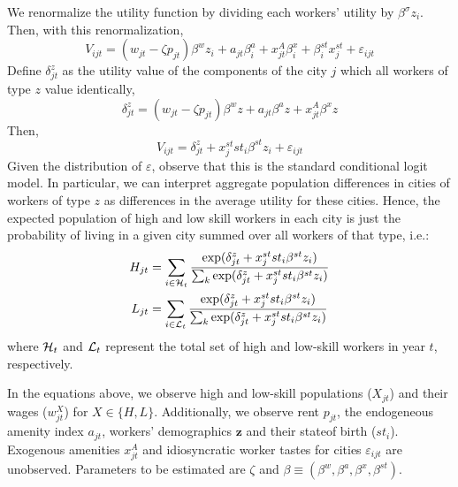 \documentclass{article}
\begin{document}
We renormalize the utility function by dividing each workers' utility by $\beta^\sigma z_i$. Then, with this renormalization,
$$V_{ijt} = (w_{jt}-\zeta p_{jt})\beta^w z_i + a_{jt}\beta_i^a + x_{jt}^A\beta_i^x + \beta_i^{st}x_{j}^{st} + \varepsilon_{ijt}$$ %
Define $\delta_{jt}^z$ as the utility value of the components of the city $j$ which all workers of type $z$ value identically,
$$\delta_{jt}^z = (w_{jt} - \zeta p_{jt})\beta^w z + a_{jt}\beta^a z + x_{jt}^A\beta^xz$$
Then,
$$V_{ijt} = \delta_{jt}^z + x_j^{st}st_i\beta^{st}z_i + \varepsilon_{ijt}$$
Given the distribution of $\varepsilon$, observe that this is the standard conditional logit model. In particular, we can interpret aggregate population differences in cities of workers of type $z$ as differences in the average utility for these cities. Hence, the expected population of high and low skill workers in each city is just the probability of living in a given city summed over all workers of that type, i.e.: 
\begin{align}
H_{jt} &= \sum_{i\in\mathcal{H}_t} \frac{\exp(\delta_{jt}^z + x_j^{st}st_i\beta^{st}z_i)}{\sum_{k} \exp(\delta_{jt}^z + x_j^{st}st_i\beta^{st}z_i)} \\
L_{jt} &= \sum_{i\in\mathcal{L}_t} \frac{\exp(\delta_{jt}^z + x_j^{st}st_i\beta^{st}z_i)}{\sum_{k} \exp(\delta_{jt}^z + x_j^{st}st_i\beta^{st}z_i)}
\end{align}
where $\mathcal{H}_t$ and $\mathcal{L}_t$ represent the total set of high and low-skill workers in year $t$, respectively.

In the equations above, we observe high and low-skill populations ($X_{jt}$) and their wages ($w_{jt}^X$) for $X \in \{H, L\}$. Additionally, we observe rent $p_{jt}$, the endogeneous amenity index $a_{jt}$, workers' demographics $\bm{z}$ and their stateof birth ($st_i$). Exogenous amenities $x_{jt}^A$ and idiosyncratic worker tastes for cities $\varepsilon_{ijt}$ are unobserved. Parameters to be estimated are $\zeta$ and $\beta \equiv (\beta^w, \beta^a, \beta^x, \beta^{st})$.
\end{document}
